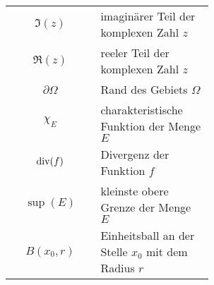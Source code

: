 \begin{table}[H]
\begin{tabular}{c p{0.57\linewidth}}
    $\Im(z)$ & imaginärer Teil der komplexen Zahl $z$ \\
    $\Re(z)$ & reeler Teil der komplexen Zahl $z$ \\
    $\partial\Omega$ & Rand des Gebiets $\Omega$ \\
    $\chi_E$ & charakteristische Funktion der Menge $E$ \\
    $\text{div}(f)$ & Divergenz der Funktion $f$ \\
    $\sup (E)$ & kleinste obere Grenze der Menge $E$ \\
    $B(x_0, r)$ & Einheitsball an der Stelle $x_0$ mit dem Radius $r$ \\
\end{tabular}
\end{table}

\begin{comment}
\begin{itemize}[label={}]
    \item $\boldsymbol{E}$ - Einheitsmatrix (wenn nicht anders angegeben in 2 Dimensionen) \\
    \item $x^T$ - transponierter Vektor zum Vektor x (analog für eine Matrix $A$) \\
    \item $f_x$ - partielle Ableitung der Funktion $f$ nach der Variable $x$ \\
    \item $f^{(n)}$ - n-te partielle Ableitung der Funktion $f$ (die Variable ist als solche gekennzeichnet) \\
    \item $\determ{A}$ - Determinante der Matrix $A$ \\
    \item $x_{1,2}$ - Nullstellen einer Funktion \\
    \item $\mathcal{O}(x)$ - Term der Größenordnung $x$ \\
    \item $\left.\pd{f(x,y)}{x}\right\vert_{i,j}$ - Ableitung der Funktion $f(x,y)$ an der Stelle $i,j$ \\
    \item $[a,b]$ - geschlossenes Intervall von $a$ bis $b$ \\
    \item $]a,b[$ - offenes Intervall von $a$ bis $b$ \\
    \item $\mathscr{D}(f)$ - Urbildraum der Funktion $f$ \\

\end{comment}

